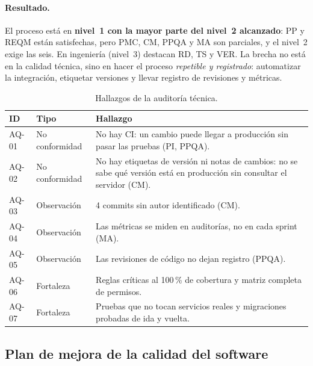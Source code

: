 \paragraph{Resultado.} El proceso está en \textbf{nivel~1 con la mayor parte del nivel~2
alcanzado}: PP y REQM están satisfechas, pero PMC, CM, PPQA y MA son parciales, y el nivel~2
exige las seis. En ingeniería (nivel~3) destacan RD, TS y VER. La brecha no está en la
calidad técnica, sino en hacer el proceso \emph{repetible y registrado}: automatizar la
integración, etiquetar versiones y llevar registro de revisiones y métricas.

\begin{table}[H]
\centering
\caption{Hallazgos de la auditoría técnica.}
\label{tab:ce02-e4-hallazgos}
\small
\begin{tabularx}{\textwidth}{L{1.3cm}L{1.6cm}X}
\toprule
\textbf{ID} & \textbf{Tipo} & \textbf{Hallazgo} \\
\midrule
AQ-01 & No conformidad & No hay CI: un cambio puede llegar a producción sin pasar las pruebas (PI, PPQA). \\
AQ-02 & No conformidad & No hay etiquetas de versión ni notas de cambios: no se sabe qué versión está en producción sin consultar el servidor (CM). \\
AQ-03 & Observación & 4 commits sin autor identificado (CM). \\
AQ-04 & Observación & Las métricas se miden en auditorías, no en cada sprint (MA). \\
AQ-05 & Observación & Las revisiones de código no dejan registro (PPQA). \\
AQ-06 & Fortaleza & Reglas críticas al 100\,\% de cobertura y matriz completa de permisos. \\
AQ-07 & Fortaleza & Pruebas que no tocan servicios reales y migraciones probadas de ida y vuelta. \\
\bottomrule
\end{tabularx}
\end{table}

\subsection{Plan de mejora de la calidad del software}


